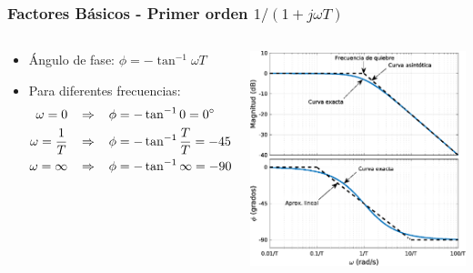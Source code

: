 \documentclass[aspectratio=169, handout]{beamer}
\theoremstyle{definition}
\theoremstyle{plain}
\theoremstyle{remark}
\begin{document}
\begin{frame}[<+->]\frametitle{Factores Básicos - Primer orden $1/(1+j \omega T)$}
\vspace*{8mm}
\begin{columns}
	\begin{column}{0.5\textwidth}
	\begin{itemize}
		\item Ángulo de fase: $\phi = -\tan^{-1} \omega T$
		\item Para diferentes frecuencias:
		\begin{align*}
			\omega = 0 \hspace*{3mm} &\Rightarrow \hspace*{3mm} \phi = - \tan^{-1} 0 = \ang{0}\\
			\omega = \frac{1}{T} \hspace*{3mm} &\Rightarrow \hspace*{3mm} \phi = -\tan^{-1}\frac{T}{T} = -\ang{45}\\
			\omega = \infty \hspace*{3mm} &\Rightarrow \hspace*{3mm} \phi = - \tan^{-1} \infty = -\ang{90}
		\end{align*}
	\end{itemize}
	\end{column}
	\begin{column}{0.5\textwidth}
	\centering
	\includegraphics[width=6.5cm]{images/bodeFirstOrderIntegral.eps}
	\end{column}
\end{columns}
\end{frame}
\end{document}
